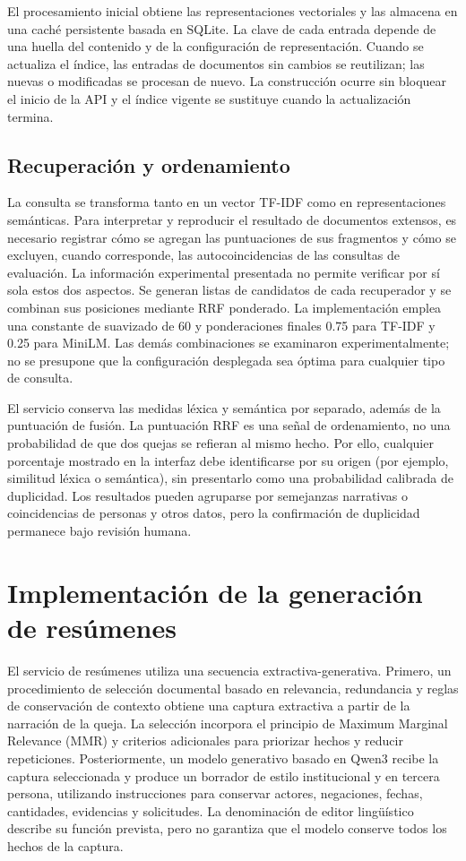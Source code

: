 El procesamiento inicial obtiene las representaciones vectoriales y las almacena en
una caché persistente basada en SQLite. La clave de cada entrada depende de una
huella del contenido y de la configuración de representación. Cuando se actualiza
el índice, las entradas de documentos sin cambios se reutilizan; las nuevas o
modificadas se procesan de nuevo. La construcción ocurre sin bloquear el inicio
de la API y el índice vigente se sustituye cuando la actualización termina.

\subsection{Recuperación y ordenamiento}
La consulta se transforma tanto en un vector TF-IDF como en representaciones
semánticas. Para interpretar y reproducir el resultado de documentos extensos,
es necesario registrar cómo se agregan las puntuaciones de sus fragmentos y cómo
se excluyen, cuando corresponde, las autocoincidencias de las consultas de evaluación.
La información experimental presentada no permite verificar por sí sola estos dos aspectos. Se generan listas de candidatos de cada recuperador y se combinan sus
posiciones mediante RRF ponderado. La implementación emplea una constante de
suavizado de 60 y ponderaciones finales 0.75 para TF-IDF y 0.25 para MiniLM.
Las demás combinaciones se examinaron experimentalmente; no se presupone que
la configuración desplegada sea óptima para cualquier tipo de consulta.

El servicio conserva las medidas léxica y semántica por separado, además de la
puntuación de fusión. La puntuación RRF es una señal de ordenamiento, no una
probabilidad de que dos quejas se refieran al mismo hecho. Por ello, cualquier porcentaje
mostrado en la interfaz debe identificarse por su origen (por ejemplo, similitud léxica
o semántica), sin presentarlo como una probabilidad calibrada de duplicidad. Los resultados pueden
agruparse por semejanzas narrativas o coincidencias de personas y otros datos,
pero la confirmación de duplicidad permanece bajo revisión humana.

\section{Implementación de la generación de resúmenes}
\label{sec:impl_resumenes}
El servicio de resúmenes utiliza una secuencia extractiva-generativa. Primero,
un procedimiento de selección documental basado en relevancia, redundancia y
reglas de conservación de contexto obtiene una captura extractiva a partir de
la narración de la queja. La selección incorpora el principio de Maximum
Marginal Relevance (MMR) y criterios adicionales para priorizar hechos y
reducir repeticiones. Posteriormente, un modelo generativo basado en Qwen3 recibe la captura
seleccionada y produce un borrador de estilo institucional y en tercera
persona, utilizando instrucciones para conservar actores, negaciones,
fechas, cantidades, evidencias y solicitudes. La denominación de editor
lingüístico describe su función prevista, pero no garantiza que el modelo
conserve todos los hechos de la captura.

